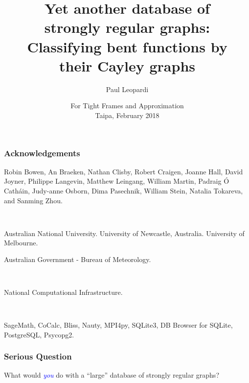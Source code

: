 \documentclass[pdf,sprung,slideColor,nocolorBG]{beamer}
\title[Yet another database of strongly regular graphs]{Yet another database of
\\
strongly regular graphs:
\\
Classifying bent functions by
\\
their Cayley graphs}
\author{Paul Leopardi}
\date{For Tight Frames and Approximation
\\
Taipa, February 2018}
\institute{University of Melbourne
\\
Australian Government - Bureau of Meteorology}
\newcommand{\Emph}[1]{\emph{\textcolor{blue}{#1}}}
\begin{document}
\frame{\titlepage}
\begin{frame}
\frametitle{Acknowledgements}
\begin{center}
Robin Bowen,
An Braeken,
Nathan Clisby,
Robert Craigen,
Joanne Hall,
David Joyner,
Philippe Langevin,
Matthew Leingang,
William Martin,
Padraig {\'O} Cath{\'a}in,
Judy-anne Osborn,
Dima Pasechnik,
William Stein,
Natalia Tokareva, and
Sanming Zhou.

~

Australian National University. University of Newcastle, Australia. University of Melbourne.

Australian Government - Bureau of Meteorology.

~

National Computational Infrastructure.

~

SageMath, CoCalc, Bliss, Nauty, MPI4py, SQLite3, DB Browser for SQLite, PostgreSQL, Psycopg2.
\end{center}
\end{frame}

\begin{frame}
\frametitle{Serious Question}
\begin{center}
\vspace{+10mm}
\large{}
What would \Emph{you} do with a ``large'' database of strongly regular graphs?
\normalsize{}
\end{center}
\end{frame}
\end{document}
